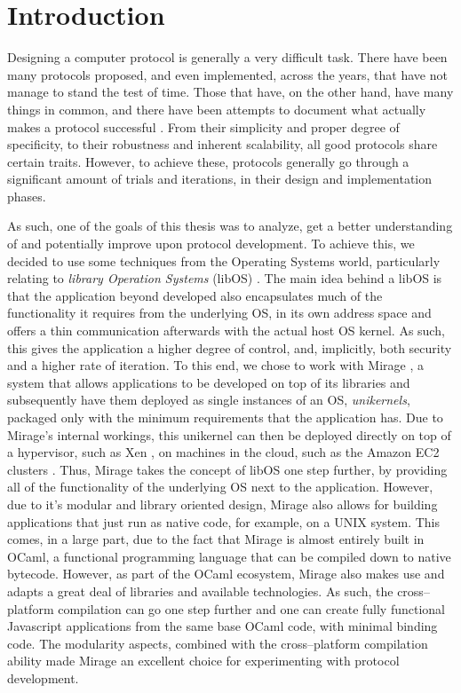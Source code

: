 \chapter{Introduction} \label{chapter:introduction}
\setcounter{page}{1}

Designing a computer protocol is generally a very difficult task.
There have been many protocols proposed, and even implemented, across the years, that have not manage to stand the test of time.
Those that have, on the other hand, have many things in common, and there have been attempts to document what actually makes a protocol successful \cite{RFC5218}.
From their simplicity and proper degree of specificity, to their robustness and inherent scalability, all good protocols share certain traits.
However, to achieve these, protocols generally go through a significant amount of trials and iterations, in their design and implementation phases.

As such, one of the goals of this thesis was to analyze, get a better understanding of and potentially improve upon protocol development.
To achieve this, we decided to use some techniques from the Operating Systems world, particularly relating to \textit{library Operation Systems} (libOS) \cite{libOS}.
The main idea behind a libOS is that the application beyond developed also encapsulates much of the functionality it requires from the underlying OS, in its own address space and offers a thin communication afterwards with the actual host OS kernel.
As such, this gives the application a higher degree of control, and, implicitly, both security and a higher rate of iteration.
To this end, we chose to work with Mirage \cite{Mirage}, a system that allows applications to be developed on top of its libraries and subsequently have them deployed as single instances of an OS, \textit{unikernels}, packaged only with the minimum requirements that the application has.
Due to Mirage's internal workings, this unikernel can then be deployed directly on top of a hypervisor, such as Xen \cite{Xen}, on machines in the cloud, such as the Amazon EC2 clusters \cite{AmazonEC2}.
Thus, Mirage takes the concept of libOS one step further, by providing all of the functionality of the underlying OS next to the application.
However, due to it's modular and library oriented design, Mirage also allows for building applications that just run as native code, for example, on a UNIX system.
This comes, in a large part, due to the fact that Mirage is almost entirely built in OCaml, a functional programming language that can be compiled down to native bytecode.
However, as part of the OCaml ecosystem, Mirage also makes use and adapts a great deal of libraries and available technologies.
As such, the cross--platform compilation can go one step further and one can create fully functional Javascript applications from the same base OCaml code, with minimal binding code.
The modularity aspects, combined with the cross--platform compilation ability made Mirage an excellent choice for experimenting with protocol development.

